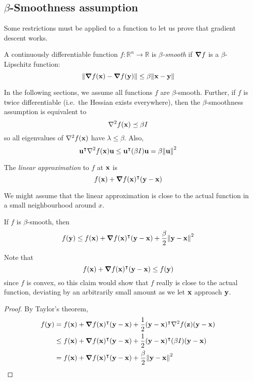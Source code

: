 \subsection{\(\beta\)-Smoothness assumption}
Some restrictions must be applied to a function to let us prove that gradient descent works.
\begin{definition}
	A continuously differentiable function \(f \colon \mathbb R^n \to \mathbb R\) is \textit{\(\beta\)-smooth} if \(\grad{f}\) is a \(\beta\)-Lipschitz function:
	\[
		\norm{\grad{f(\vb x) - \grad{f(\vb y)}}} \leq \beta \norm{\vb x - \vb y}
	\]
\end{definition}
\noindent In the following sections, we assume all functions \(f\) are \(\beta\)-smooth.
Further, if \(f\) is twice differentiable (i.e.\ the Hessian exists everywhere), then the \(\beta\)-smoothness assumption is equivalent to
\[
	\laplacian{f(\vb x)} \preceq \beta I
\]
so all eigenvalues of \(\laplacian{f(\vb x)}\) have \(\lambda \leq \beta\).
Also,
\[
	\vb u^\transpose \laplacian{f(\vb x)} \vb u \leq \vb u^\transpose (\beta I) \vb u = \beta \norm{\vb u}^2
\]
\begin{definition}
	The \textit{linear approximation} to \(f\) at \(\vb x\) is
	\[
		f(\vb x) + \grad{f(\vb x)}^\intercal (\vb y - \vb x)
	\]
\end{definition}
\noindent We might assume that the linear approximation is close to the actual function in a small neighbourhood around \(x\).
\begin{claim}
	If \(f\) is \(\beta\)-smooth, then
	\[
		f(\vb y) \leq f(\vb x) + \grad{f(\vb x)}^\intercal (\vb y - \vb x) + \frac{\beta}{2}\norm{\vb y - \vb x}^2
	\]
\end{claim}
\noindent Note that
\[
	f(\vb x) + \grad{f(\vb x)}^\intercal (\vb y - \vb x) \leq f(\vb y)
\]
since \(f\) is convex, so this claim would show that \(f\) really is close to the actual function, deviating by an arbitrarily small amount as we let \(\vb x\) approach \(\vb y\).
\begin{proof}
	By Taylor's theorem,
	\begin{align*}
		f(\vb y) & = f(\vb x) + \grad{f(\vb x)}^\transpose (\vb y - \vb x) + \frac{1}{2}(\vb y - \vb x)^\transpose \laplacian{f(\vb z)}(\vb y - \vb x) \\
		         & \leq f(\vb x) + \grad{f(\vb x)}^\transpose (\vb y - \vb x) + \frac{1}{2}(\vb y - \vb x)^\transpose (\beta I) (\vb y - \vb x)        \\
		         & = f(\vb x) + \grad{f(\vb x)}^\transpose (\vb y - \vb x) + \frac{\beta}{2}\norm{\vb y - \vb x}^2                                     \\
	\end{align*}
\end{proof}
